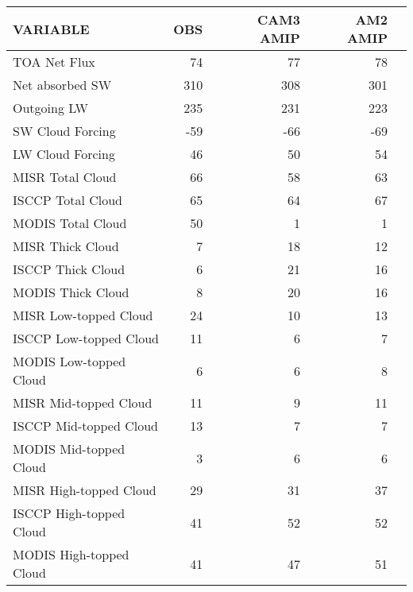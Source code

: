 \begin{tabular}{lrrrr}
\hline
                VARIABLE &                      OBS &                CAM3 AMIP &                 AM2 AMIP \\ \hline
            TOA Net Flux &                       74 &                       77 &                       78 \\
         Net absorbed SW &                      310 &                      308 &                      301 \\
             Outgoing LW &                      235 &                      231 &                      223 \\
        SW Cloud Forcing &                      -59 &                      -66 &                      -69 \\
        LW Cloud Forcing &                       46 &                       50 &                       54 \\
        MISR Total Cloud &                       66 &                       58 &                       63 \\
       ISCCP Total Cloud &                       65 &                       64 &                       67 \\
       MODIS Total Cloud &                       50 &                        1 &                        1 \\
        MISR Thick Cloud &                        7 &                       18 &                       12 \\
       ISCCP Thick Cloud &                        6 &                       21 &                       16 \\
       MODIS Thick Cloud &                        8 &                       20 &                       16 \\
   MISR Low-topped Cloud &                       24 &                       10 &                       13 \\
  ISCCP Low-topped Cloud &                       11 &                        6 &                        7 \\
  MODIS Low-topped Cloud &                        6 &                        6 &                        8 \\
   MISR Mid-topped Cloud &                       11 &                        9 &                       11 \\
  ISCCP Mid-topped Cloud &                       13 &                        7 &                        7 \\
  MODIS Mid-topped Cloud &                        3 &                        6 &                        6 \\
  MISR High-topped Cloud &                       29 &                       31 &                       37 \\
 ISCCP High-topped Cloud &                       41 &                       52 &                       52 \\
 MODIS High-topped Cloud &                       41 &                       47 &                       51 \\ \hline
\end{tabular}

